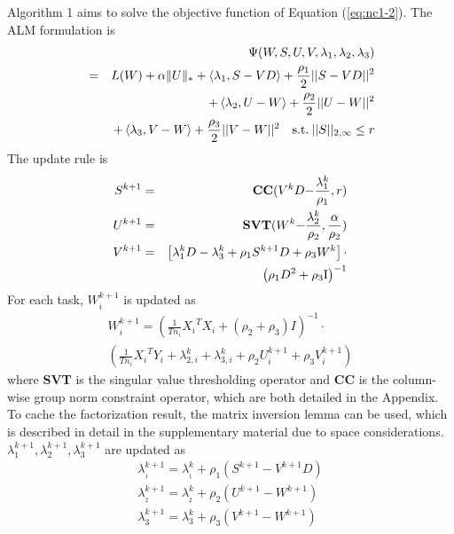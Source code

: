 \documentclass{article}
\newcounter{thm_counter}
\newcounter{lem_counter}
\begin{document}
Algorithm 1 aims to solve the objective function of Equation (\ref{eq:nc1-2}).
The ALM formulation is 
\begin{eqnarray}
\nonumber
&& \Psi (W,S,U,V,{\lambda _1},{\lambda _2},{\lambda _3})\\
\nonumber
&=& L(W)+\alpha\|U\|_{*}+ \left\langle {{\lambda _1},S - VD} \right\rangle  + \frac{{{\rho _1}}}{2}||S - VD|{|^2}\\
\nonumber
&& +\left\langle {{\lambda_{2}},U-W}\right\rangle +\frac{{\rho_{2}}}{2}||U-W||^{2}\\
\nonumber
&& +\left\langle {{\lambda_{3}},V-W}\right\rangle +\frac{{\rho_{3}}}{2}||V-W||^{2}
\quad{\rm s.t.}\:||S|{|_{2,\infty}\leq r}
\label{eq:nc1-admm}
\end{eqnarray}
%
The update rule is
%
\begin{eqnarray}
\label{eq:admm1}
\nonumber
{S^{k+1}} &=& {\bf{CC}}({V^k}D{\rm{ - }}\frac{{\lambda ^k_1}}{{{\rho _1}}},r)\\
\nonumber
{U^{k+1}} &=& {\bf{SVT}}({W^k}{\rm{ - }}\frac{{\lambda ^k_2}}{{{\rho _2}}},\frac{\alpha }{{{\rho _2}}})\\
\nonumber
{V^{k+1}} &=& \left[ {{\lambda ^k_1}D - \lambda ^k_3 + {\rho _1}{S^{k + 1}}D + {\rho _3}{W^k}} \right] \cdot \\
&&{\left({{\rho_{1}}{D^{2}}+{\rho_{3}}{\rm {I}}}\right)^{-1}}
\end{eqnarray}
For each task, $W^{k+1}_{i}$ is updated as
%
\begin{equation}
\begin{array}{l}
W_i^{k + 1} = {(\frac{1}{{T{n_i}}}{X_i}^T{X_i} + ({\rho _2} + {\rho _3})I)^{ - 1}} \cdot \\
\left(\frac{1}{{T{n_i}}}{X_i}^T{Y_i} + {\lambda^k _{2,i}} + {\lambda^k _{3,i}} + {\rho _2}U_i^{k + 1} + {\rho _3}V_i^{k + 1}\right)
\end{array}
\label{eq:nc1-w}
\end{equation}
%
where \textbf{SVT} is the singular value thresholding operator and \textbf{CC} is the column-wise group norm constraint operator, which are both detailed in the Appendix.
To cache the factorization result, the matrix inversion lemma can be used,
which is described in detail in the supplementary material due to space considerations. 
${\lambda^{k + 1}_{1}}, {\lambda^{k + 1}_{2}}, {\lambda^{k + 1}_{3}}$ are updated as
\begin{equation}
\begin{array}{*{20}{l}}
{\lambda _{_1}^{k + 1} = \lambda _{_1}^k + {\rho _1}({S^{k + 1}} - {V^{k + 1}}D)}\\
{\lambda _{_2}^{k + 1} = \lambda _{_2}^k + {\rho _2}({U^{k + 1}} - {W^{k + 1}})}\\
{\lambda _3^{k + 1} = \lambda _3^k + {\rho _3}({V^{k + 1}} - {W^{k + 1}})}
\end{array}
\label{eq:lambda1}
\end{equation}
\end{document}
